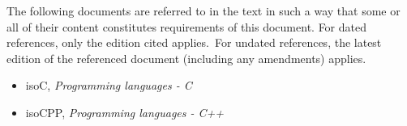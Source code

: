 
\p The following documents are referred to in the text in such a way that some
or all of their content constitutes requirements of this document. For dated
references, only the edition cited applies.\ For undated references, the latest
edition of the referenced document (including any amendments) applies.

\begin{itemize}
  \item \gls{isoC}, \textit{Programming languages - C}
  \item \gls{isoCPP}, \textit{Programming languages - C++}
\end{itemize}
